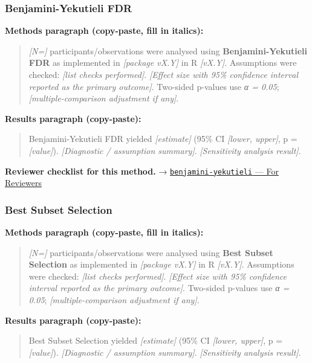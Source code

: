 \documentclass[
]{article}
\begin{document}
\subsubsection{Benjamini-Yekutieli FDR}\label{benjamini-yekutieli-fdr}

\textbf{Methods paragraph (copy-paste, fill in italics):}

\begin{quote}
\emph{{[}N={]}} participants/observations were analysed using
\textbf{Benjamini-Yekutieli FDR} as implemented in \emph{{[}package
vX.Y{]}} in R \emph{{[}vX.Y{]}}. Assumptions were checked: \emph{{[}list
checks performed{]}}. \emph{{[}Effect size with 95\% confidence interval
reported as the primary outcome{]}}. Two-sided p-values use \emph{α =
0.05}; \emph{{[}multiple-comparison adjustment if any{]}}.
\end{quote}

\textbf{Results paragraph (copy-paste):}

\begin{quote}
Benjamini-Yekutieli FDR yielded \emph{{[}estimate{]}} (95\% CI
\emph{{[}lower, upper{]}}, p = \emph{{[}value{]}}). \emph{{[}Diagnostic
/ assumption summary{]}}. \emph{{[}Sensitivity analysis result{]}}.
\end{quote}

\textbf{Reviewer checklist for this method.} →
\href{../chapters/04-inferential/benjamini-yekutieli.Rmd\#for-reviewers}{\texttt{benjamini-yekutieli}
--- For Reviewers}

\subsubsection{Best Subset Selection}\label{best-subset-selection}

\textbf{Methods paragraph (copy-paste, fill in italics):}

\begin{quote}
\emph{{[}N={]}} participants/observations were analysed using
\textbf{Best Subset Selection} as implemented in \emph{{[}package
vX.Y{]}} in R \emph{{[}vX.Y{]}}. Assumptions were checked: \emph{{[}list
checks performed{]}}. \emph{{[}Effect size with 95\% confidence interval
reported as the primary outcome{]}}. Two-sided p-values use \emph{α =
0.05}; \emph{{[}multiple-comparison adjustment if any{]}}.
\end{quote}

\textbf{Results paragraph (copy-paste):}

\begin{quote}
Best Subset Selection yielded \emph{{[}estimate{]}} (95\% CI
\emph{{[}lower, upper{]}}, p = \emph{{[}value{]}}). \emph{{[}Diagnostic
/ assumption summary{]}}. \emph{{[}Sensitivity analysis result{]}}.
\end{quote}
\end{document}
